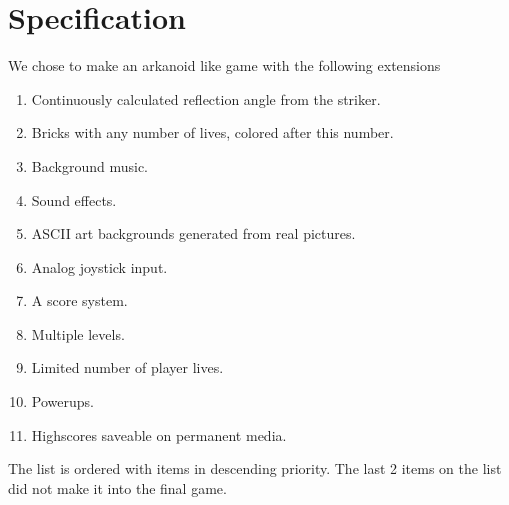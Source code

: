 \section{Specification}
We chose to make an arkanoid like game with the following extensions

\begin{enumerate}
\item Continuously calculated reflection angle from the striker.
\item Bricks with any number of lives, colored after this number.
\item Background music.
\item Sound effects.
\item ASCII art backgrounds generated from real pictures.
\item Analog joystick input.
\item A score system.
\item Multiple levels.
\item Limited number of player lives.
\item Powerups.
\item Highscores saveable on permanent media.
\end{enumerate}

The list is ordered with items in descending priority. The last 2 items on the list
did not make it into the final game.
